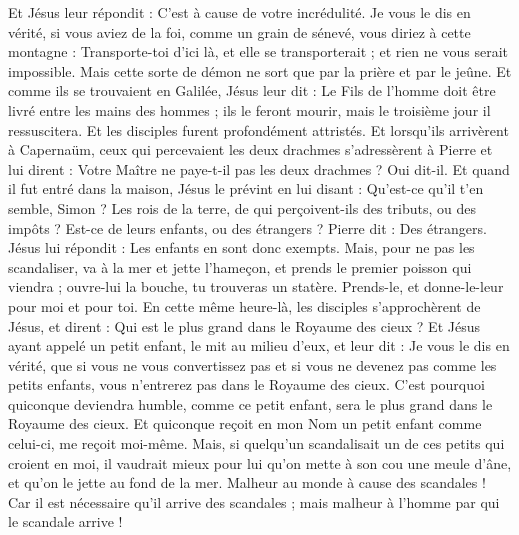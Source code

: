 \begin{multicols}{2}
Et Jésus leur répondit : C'est à cause de votre incrédulité. Je vous le dis en vérité, si vous aviez de la foi, comme un grain de sénevé, vous diriez à cette montagne : Transporte-toi d'ici là, et elle se transporterait ; et rien ne vous serait impossible.
Mais cette sorte de démon ne sort que par la prière et par le jeûne.
Et comme ils se trouvaient en Galilée, Jésus leur dit : Le Fils de l'homme doit être livré entre les mains des hommes ;
ils le feront mourir, mais le troisième jour il ressuscitera. Et les disciples furent profondément attristés.
Et lorsqu'ils arrivèrent à Capernaüm, ceux qui percevaient les deux drachmes s'adressèrent à Pierre et lui dirent : Votre Maître ne paye-t-il pas les deux drachmes ?
Oui dit-il. Et quand il fut entré dans la maison, Jésus le prévint en lui disant : Qu'est-ce qu'il t'en semble, Simon ? Les rois de la terre, de qui perçoivent-ils des tributs, ou des impôts ? Est-ce de leurs enfants, ou des étrangers ?
Pierre dit : Des étrangers. Jésus lui répondit : Les enfants en sont donc exempts.
Mais, pour ne pas les scandaliser, va à la mer et jette l'hameçon, et prends le premier poisson qui viendra ; ouvre-lui la bouche, tu trouveras un statère. Prends-le, et donne-le-leur pour moi et pour toi.
\VerseOne{}En cette même heure-là, les disciples s’approchèrent de Jésus, et dirent : Qui est le plus grand dans le Royaume des cieux ?
Et Jésus ayant appelé un petit enfant, le mit au milieu d'eux,
et leur dit : Je vous le dis en vérité, que si vous ne vous convertissez pas et si vous ne devenez pas comme les petits enfants, vous n'entrerez pas dans le Royaume des cieux.
C'est pourquoi quiconque deviendra humble, comme ce petit enfant, sera le plus grand dans le Royaume des cieux.
Et quiconque reçoit en mon Nom un petit enfant comme celui-ci, me reçoit moi-même.
Mais, si quelqu’un scandalisait un de ces petits qui croient en moi, il vaudrait mieux pour lui qu'on mette à son cou une meule d'âne, et qu'on le jette au fond de la mer.
Malheur au monde à cause des scandales ! Car il est nécessaire qu'il arrive des scandales ; mais malheur à l'homme par qui le scandale arrive !

\end{multicols}

